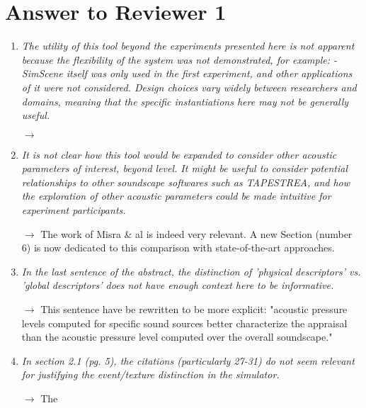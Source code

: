 \documentclass[10pt]{article}
\begin{document}
\section{Answer to Reviewer 1}

\begin{enumerate}

\item \emph{The utility of this tool beyond the experiments presented here is not apparent because the flexibility of the system was not demonstrated, for example:
- SimScene itself was only used in the first experiment, and other applications of it were not considered. Design choices vary widely between researchers and domains, meaning that the specific instantiations here may not be generally useful.}

$\rightarrow$

\item \emph{It is not clear how this tool would be expanded to consider other acoustic parameters of interest, beyond level. It might be useful to consider potential relationships to other soundscape softwares such as TAPESTREA, and how the exploration of other acoustic parameters could be made intuitive for experiment participants.}

$\rightarrow$ The work of Misra \& al is indeed very relevant. A new Section (number 6) is now dedicated to this comparison with state-of-the-art approaches.

\item \emph{In the last sentence of the abstract, the distinction of 'physical descriptors' vs. 'global descriptors'  does not have enough context here to be informative.}

$\rightarrow$ This sentence have be rewritten to be more explicit: "acoustic pressure levels computed for specific sound sources better characterize the appraisal than the acoustic pressure level computed over the overall soundscape."

\item \emph{In section 2.1 (pg. 5), the citations (particularly 27-31) do not seem relevant for justifying the event/texture distinction in the simulator.}

$\rightarrow$ The

\end{enumerate}
\end{document}
